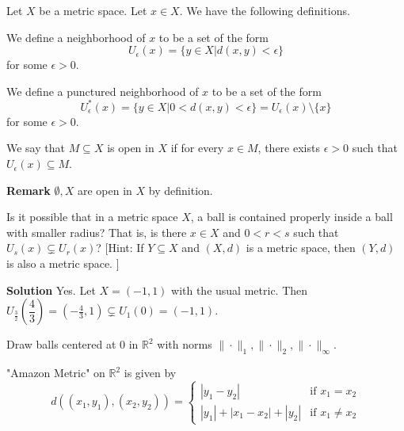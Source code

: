 \documentclass[main.tex]{subfiles}
\begin{document}
\par Let $X$ be a metric space. Let $x\in X$. We have the following definitions.
\begin{definition}
    We define a neighborhood of $x$ to be a set of the form \[ U_{\epsilon} (x) = \{y \in X | d(x, y) < \epsilon \} \] for some $\epsilon > 0$.
\end{definition}
\begin{definition}
    We define a punctured neighborhood of $x$ to be a set of the form \[ U_{\epsilon}^{\ast} (x) = \{y \in X | 0 < d(x, y) < \epsilon \} = U_{\epsilon} (x) \setminus \{x\} \] for some $\epsilon > 0$. 
\end{definition}

\begin{definition}
    We say that $M \subseteq X$ is open in $X$ if for every $x \in M$, there exists $\epsilon > 0$ such that $U_{\epsilon} (x) \subseteq M$.
\end{definition}
\par \noindent \textbf{Remark} $\emptyset, X$ are open in $X$ by definition. 

\begin{example}
    Is it possible that in a metric space $X$, a ball is contained properly inside a ball with smaller radius? That is, is there $x \in X$ and $0 < r < s$ such that $U_s (x) \subsetneq U_r (x)$?
    [Hint: If $Y \subseteq X$ and $(X, d)$ is a metric space, then $(Y, d)$ is also a metric space. ]
\end{example}

\par \noindent \textbf{Solution} Yes. Let $X = (-1, 1)$ with the usual metric. Then $U_{\frac{3}{2}} (\dfrac{4}{3}) = (-\frac{4}{3}, 1) \subsetneq U_1 (0) = (-1, 1)$. 

\begin{example}
    Draw balls centered at $0$ in $\mathbb{R}^2$ with norms $\|\cdot\|_1, \|\cdot\|_2, \|\cdot\|_{\infty}$. 
\end{example}

\begin{example} 
    "Amazon Metric" on $\mathbb{R}^2$ is given by 
    \[d((x_1, y_1), (x_2, y_2)) = \begin{cases}
    |y_1 - y_2|   &  \text{if } x_1 = x_2  \\
    |y_1| + |x_1 - x_2| + |y_2|   &  \text{if } x_1 \neq x_2
   \end{cases}\] 
\end{example}
\end{document}
